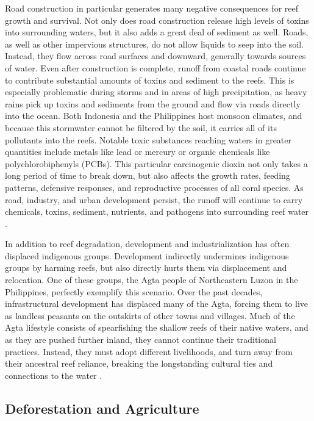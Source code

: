 \documentclass{book}\usepackage{knitr}
\begin{document}
Road construction in particular generates many negative consequences for reef growth and survival. Not only does road construction release high levels of toxins into surrounding waters, but it also adds a great deal of sediment as well. Roads, as well as other impervious structures, do not allow liquids to seep into the soil. Instead, they flow across road surfaces and downward, generally towards sources of water. Even after construction is complete, runoff from coastal roads continue to contribute substantial amounts of toxins and sediment to the reefs. This is especially problematic during storms and in areas of high precipitation, as heavy rains pick up toxins and sediments from the ground and flow via roads directly into the ocean. Both Indonesia and the Philippines host monsoon climates, and because this stormwater cannot be filtered by the soil, it carries all of its pollutants into the reefs. Notable toxic substances reaching waters in greater quantities include metals like lead or mercury or organic chemicals like polychlorobiphenyls (PCBs). This particular carcinogenic dioxin not only takes a long period of time to break down, but also affects the growth rates, feeding patterns, defensive responses, and reproductive processes of all coral species. As road, industry, and urban development persist, the runoff will continue to carry chemicals, toxins, sediment, nutrients, and pathogens into surrounding reef water \citep{USEPA_2017}.

In addition to reef degradation, development and industrialization has often displaced indigenous groups. Development indirectly undermines indigenous groups by harming reefs, but also directly hurts them via displacement and relocation. One of these groups, the Agta people of Northeastern Luzon in the Philippines, perfectly exemplify this scenario. Over the past decades, infrastructural development has displaced many of the Agta, forcing them to live as landless peasants on the outskirts of other towns and villages. Much of the Agta lifestyle consists of spearfishing the shallow reefs of their native waters, and as they are pushed further inland, they cannot continue their traditional practices. Instead, they must adopt different livelihoods, and turn away from their ancestral reef reliance, breaking the longstanding cultural ties and connections to the water \citep{RePEc:gam:jsusta:v:12:y:2020:i:19:p:7983-:d:420111}.

\subsection{Deforestation and Agriculture}
\end{document}
